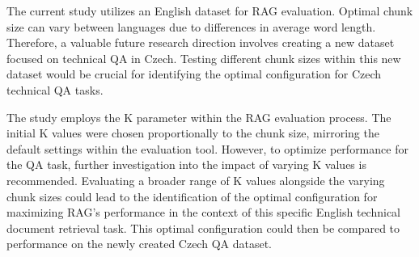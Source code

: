 The current study utilizes an English dataset for \ac{RAG} evaluation.
Optimal chunk size can vary between languages due to differences in average word length.
Therefore, a valuable future research direction involves creating a new dataset focused on technical \ac{QA} in Czech.
Testing different chunk sizes within this new dataset would be crucial for identifying the optimal configuration for Czech technical \ac{QA} tasks.

The study employs the K parameter within the \ac{RAG} evaluation process.
The initial K values were chosen proportionally to the chunk size, mirroring the default settings within the evaluation tool.
However, to optimize performance for the \ac{QA} task, further investigation into the impact of varying K values is recommended.
Evaluating a broader range of K values alongside the varying chunk sizes could lead to the identification of the optimal configuration for maximizing \ac{RAG}'s performance in the context of this specific English technical document retrieval task.
This optimal configuration could then be compared to performance on the newly created Czech \ac{QA} dataset.




